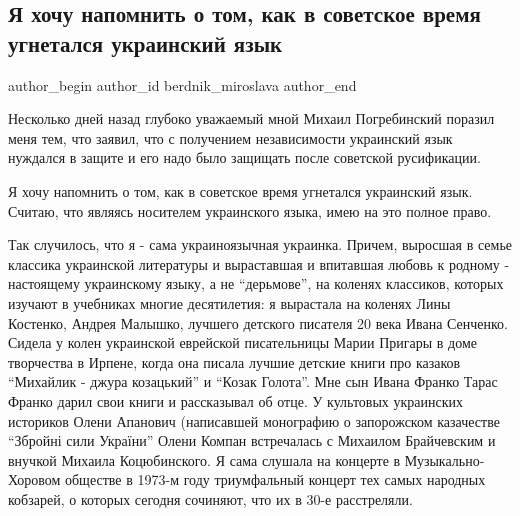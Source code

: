  
 
 
 
 
\subsection{Я хочу напомнить о том, как в советское время угнетался украинский язык}
\label{sec:16_01_2021.tg.berdnik_miroslava.1.mova_ussr}

\ifcmt
 author_begin
   author_id berdnik_miroslava
 author_end
\fi

Несколько дней назад глубоко уважаемый мной Михаил Погребинский поразил меня
тем, что заявил, что с получением независимости украинский язык нуждался в
защите и его надо было защищать после советской русификации.

Я хочу напомнить о том, как в советское время угнетался украинский язык.
Считаю, что являясь носителем украинского языка, имею на это полное право.

 
Так случилось, что я - сама украиноязычная украинка. Причем, выросшая в семье
классика украинской литературы и выраставшая и впитавшая любовь к родному -
настоящему украинскому языку, а не \enquote{дерьмове}, на коленях классиков, которых
изучают в учебниках многие десятилетия: я вырастала на коленях Лины Костенко,
Андрея Малышко, лучшего детского писателя 20 века Ивана Сенченко. Сидела у
колен украинской еврейской писательницы Марии Пригары в доме творчества в
Ирпене, когда она писала лучшие детские книги про казаков \enquote{Михайлик - джура
козацький} и \enquote{Козак Голота}. Мне сын Ивана Франко Тарас Франко дарил свои книги
и рассказывал об отце. У культовых украинских историков Олени Апанович
(написавшей монографию о запорожском казачестве \enquote{Збройні сили України} Олени
Компан встречалась с Михаилом Брайчевским и внучкой Михаила Коцюбинского. Я
сама слушала на концерте в Музыкально-Хоровом обществе в 1973-м году
триумфальный концерт тех самых народных кобзарей, о которых сегодня сочиняют,
что их в 30-е расстреляли.

